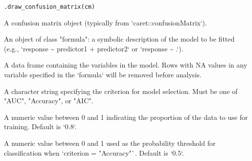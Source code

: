 \documentclass[a4paper]{book}
\begin{document}
%
\begin{Usage}
\begin{verbatim}
.draw_confusion_matrix(cm)
\end{verbatim}
\end{Usage}
%
\begin{Arguments}
\begin{ldescription}
\item[\code{cm}] A confusion matrix object (typically from `caret::confusionMatrix`).

\item[\code{formula}] An object of class \bsl{}"formula\bsl{}": a symbolic description of the
model to be fitted (e.g., `response \textasciitilde{} predictor1 + predictor2` or `response \textasciitilde{} .`).

\item[\code{data}] A data frame containing the variables in the model. Rows with NA
values in any variable specified in the `formula` will be removed before analysis.

\item[\code{criterion}] A character string specifying the criterion for model selection.
Must be one of "AUC", "Accuracy", or "AIC".

\item[\code{training\_percent}] A numeric value between 0 and 1 indicating the proportion
of the data to use for training. Default is `0.8`.

\item[\code{threshold}] A numeric value between 0 and 1 used as the probability
threshold for classification when `criterion = "Accuracy"`. Default is `0.5`.
\end{ldescription}
\end{Arguments}
%
\end{document}
